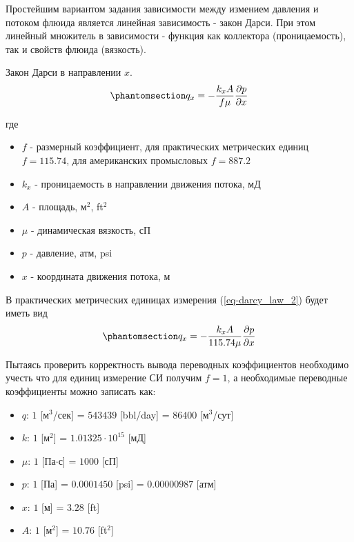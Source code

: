 \documentclass[
  russian,
  letterpaper,
  DIV=11,
  numbers=noendperiod,
  oneside]{scrartcl}
\providecommand{\tightlist}{%
  \setlength{\itemsep}{0pt}\setlength{\parskip}{0pt}}
\begin{document}
Простейшим вариантом задания зависимости между измением давления и
потоком флюида является линейная зависимость - закон Дарси. При этом
линейный множитель в зависимости - функция как коллектора
(проницаемость), так и свойств флюида (вязкость).

Закон Дарси в направлении \(x\).
\begin{equation}\phantomsection\label{eq-darcy_law_2}{ 
q_x = -  \dfrac{k_x A}{f\mu} \dfrac{\partial p}{\partial x} 
}\end{equation}

где

\begin{itemize}
\tightlist
\item
  \(f\) - размерный коэффициент, для практических метрических единиц
  \(f= 115.74\), для американских промысловых \(f = 887.2\)
\item
  \(k_x\) - проницаемость в направлении движения потока, мД
\item
  \(A\) - площадь, м\(^2\), ft\(^2\)
\item
  \(\mu\) - динамическая вязкость, сП
\item
  \(p\) - давление, атм, psi
\item
  \(x\) - координата движения потока, м
\end{itemize}

В практических метрических единицах измерения (\ref{eq-darcy_law_2})
будет иметь вид \begin{equation}\phantomsection\label{eq-darcy_law_3}{ 
q_x = -  \dfrac{k_x A}{115.74\mu} \dfrac{\partial p}{\partial x} 
}\end{equation}

Пытаясь проверить корректность вывода переводных коэффициентов
необходимо учесть что для единиц измерение СИ получим \(f=1\), а
необходимые переводные коэффициенты можно записать как:

\begin{itemize}
\tightlist
\item
  \(q\): \(1\) {[}м\(^3\)/сек{]} = \(543439\) {[}bbl/day{]} = \(86400\)
  {[}м\(^3\)/сут{]}
\item
  \(k\): \(1\) {[}м\(^2\){]} = \(1.01325 \cdot 10^{15}\) {[}мД{]}
\item
  \(\mu\): \(1\) {[}Па\(\cdot\)с{]} = \(1000\) {[}сП{]}
\item
  \(p\): \(1\) {[}Па{]} = \(0.0001450\) {[}psi{]} = \(0.00000987\)
  {[}атм{]}
\item
  \(x\): \(1\) {[}м{]} = \(3.28\) {[}ft{]}
\item
  \(A\): \(1\) {[}м\(^2\){]} = \(10.76\) {[}ft\(^2\){]}
\end{itemize}
\end{document}

